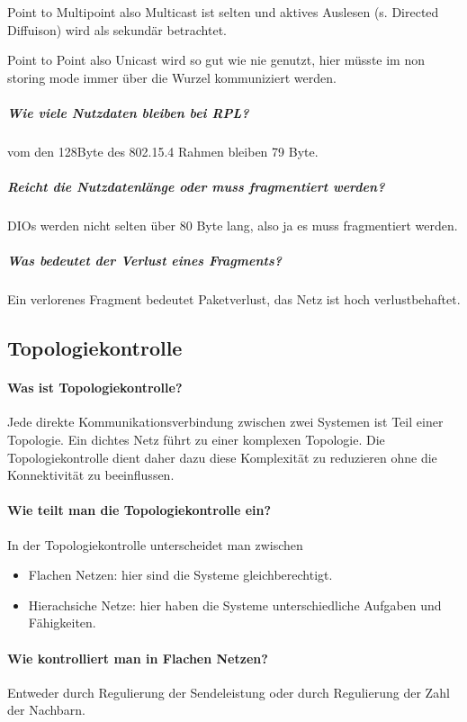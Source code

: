 		Point to Multipoint also Multicast ist selten und aktives Auslesen (s. Directed Diffuison) wird als sekundär betrachtet.
		
		Point to Point also Unicast wird so gut wie nie genutzt, hier müsste im non storing mode immer über die Wurzel kommuniziert werden.
		
		\subparagraph{Wie viele Nutzdaten bleiben bei RPL?}
		vom den 128Byte des 802.15.4 Rahmen bleiben 79 Byte.
		\subparagraph{Reicht die Nutzdatenlänge oder muss fragmentiert werden?}
		DIOs werden nicht selten über 80 Byte lang, also ja es muss fragmentiert werden.
		
		\subparagraph{Was bedeutet der Verlust eines Fragments?}
		Ein verlorenes Fragment bedeutet Paketverlust, das Netz ist hoch verlustbehaftet.
		
\subsection{Topologiekontrolle}

	\paragraph{Was ist Topologiekontrolle?}
	Jede direkte Kommunikationsverbindung zwischen zwei Systemen ist Teil einer Topologie. Ein dichtes Netz führt zu einer komplexen Topologie. Die Topologiekontrolle dient daher dazu diese Komplexität zu reduzieren ohne die Konnektivität zu beeinflussen.
	
	
	\paragraph{Wie teilt man die Topologiekontrolle ein?}
	In der Topologiekontrolle unterscheidet man zwischen 
	\begin{itemize}
		\item Flachen Netzen: hier sind die Systeme gleichberechtigt.
		\item Hierachsiche Netze: hier haben die Systeme unterschiedliche Aufgaben und Fähigkeiten.
	\end{itemize}
	
	\paragraph{Wie kontrolliert man in Flachen Netzen?}
	Entweder durch Regulierung der Sendeleistung oder durch Regulierung der Zahl der Nachbarn.
	
